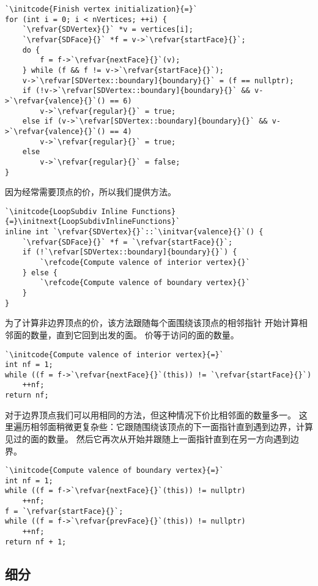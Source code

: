 \begin{lstlisting}
`\initcode{Finish vertex initialization}{=}`
for (int i = 0; i < nVertices; ++i) {
    `\refvar{SDVertex}{}` *v = vertices[i];
    `\refvar{SDFace}{}` *f = v->`\refvar{startFace}{}`;
    do {
        f = f->`\refvar{nextFace}{}`(v);
    } while (f && f != v->`\refvar{startFace}{}`);
    v->`\refvar[SDVertex::boundary]{boundary}{}` = (f == nullptr);
    if (!v->`\refvar[SDVertex::boundary]{boundary}{}` && v->`\refvar{valence}{}`() == 6)
        v->`\refvar{regular}{}` = true;
    else if (v->`\refvar[SDVertex::boundary]{boundary}{}` && v->`\refvar{valence}{}`() == 4)
        v->`\refvar{regular}{}` = true;
    else
        v->`\refvar{regular}{}` = false;
}
\end{lstlisting}

因为经常需要顶点的价，所以我们提供方法。
\begin{lstlisting}
`\initcode{LoopSubdiv Inline Functions}{=}\initnext{LoopSubdivInlineFunctions}`
inline int `\refvar{SDVertex}{}`::`\initvar{valence}{}`() {
    `\refvar{SDFace}{}` *f = `\refvar{startFace}{}`;
    if (!`\refvar[SDVertex::boundary]{boundary}{}`) {
        `\refcode{Compute valence of interior vertex}{}`
    } else {
        `\refcode{Compute valence of boundary vertex}{}`
    }
}
\end{lstlisting}

为了计算非边界顶点的价，该方法跟随每个面围绕该顶点的相邻指针
开始计算相邻面的数量，直到它回到出发的面。
价等于访问的面的数量。
\begin{lstlisting}
`\initcode{Compute valence of interior vertex}{=}`
int nf = 1;
while ((f = f->`\refvar{nextFace}{}`(this)) != `\refvar{startFace}{}`)
    ++nf;
return nf;
\end{lstlisting}

对于边界顶点我们可以用相同的方法，但这种情况下价比相邻面的数量多一。
这里遍历相邻面稍微更复杂些：它跟随围绕该顶点的下一面指针直到遇到边界，计算见过的面的数量。
然后它再次从开始并跟随上一面指针直到在另一方向遇到边界。
\begin{lstlisting}
`\initcode{Compute valence of boundary vertex}{=}`
int nf = 1;
while ((f = f->`\refvar{nextFace}{}`(this)) != nullptr)
    ++nf;
f = `\refvar{startFace}{}`;
while ((f = f->`\refvar{prevFace}{}`(this)) != nullptr)
    ++nf;
return nf + 1;
\end{lstlisting}
\subsection{细分}\label{sub:细分}